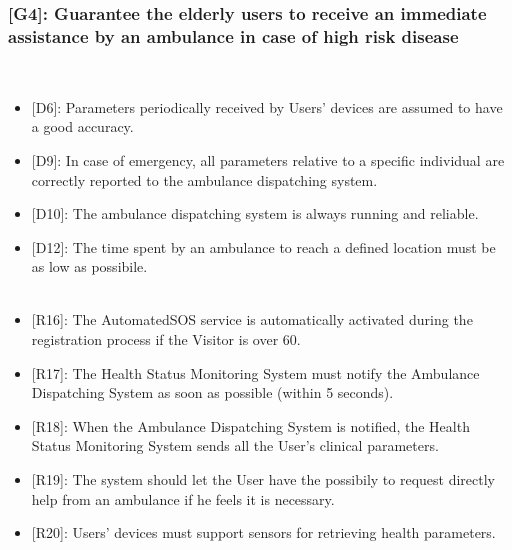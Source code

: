 \documentclass[12pt,a4paper]{article}
\begin{document}
	\subsubsection*{{[}{G4}{]}: Guarantee the elderly users to receive an immediate assistance by an ambulance in case of high risk disease}
	\begin{itemize}\\
		\begin{itemize}
			\item {[D6]}: Parameters periodically received by Users' devices are assumed to have a good accuracy. 
			\item {[D9]}: In case of emergency, all parameters relative to a specific individual are correctly reported to the ambulance dispatching system.
			\item {[D10]}: The ambulance dispatching system is always running and reliable.
			\item {[D12]}: The time spent by an ambulance to reach a defined location must be as low as possibile. 
			\\ \\
			\item {[R16]}: The AutomatedSOS service is automatically activated during the registration process if the Visitor is over 60.
			\item {[R17]}: The Health Status Monitoring System must notify the Ambulance Dispatching System as soon as possible (within 5 seconds).
			\item {[R18]}: When the Ambulance Dispatching System is notified, the Health Status Monitoring System sends all the User's clinical parameters.
			\item {[R19]}: The system should let the User have the possibily to request directly help from an ambulance if he feels it is necessary.
			\item {[R20]}: Users' devices must support sensors for retrieving health parameters.
		\end{itemize}
	\end{itemize}
\end{document}
